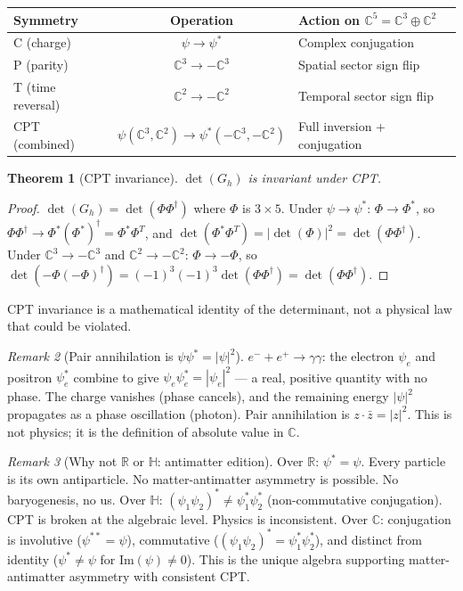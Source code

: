 \documentclass[12pt]{article}
\newtheorem{theorem}{Theorem}[section]
\theoremstyle{remark}
\newtheorem{remark}[theorem]{Remark}
\theoremstyle{definition}
\begin{document}
\begin{center}
\begin{tabular}{lcl}
\hline
Symmetry & Operation & Action on $\mathbb{C}^5 = \mathbb{C}^3 \oplus \mathbb{C}^2$ \\
\hline
C (charge) & $\psi \to \psi^*$ & Complex conjugation \\
P (parity) & $\mathbb{C}^3 \to -\mathbb{C}^3$ & Spatial sector sign flip \\
T (time reversal) & $\mathbb{C}^2 \to -\mathbb{C}^2$ & Temporal sector sign flip \\
\hline
CPT (combined) & $\psi(\mathbb{C}^3, \mathbb{C}^2) \to \psi^*(-\mathbb{C}^3, -\mathbb{C}^2)$ & Full inversion + conjugation \\
\hline
\end{tabular}
\end{center}

\begin{theorem}[CPT invariance]
$\det(G_h)$ is invariant under CPT.
\end{theorem}

\begin{proof}
$\det(G_h) = \det(\Phi\Phi^\dagger)$ where $\Phi$ is $3 \times 5$. Under $\psi \to \psi^*$: $\Phi \to \Phi^*$, so $\Phi\Phi^\dagger \to \Phi^*(\Phi^*)^\dagger = \Phi^*\Phi^T$, and $\det(\Phi^*\Phi^T) = |\det(\Phi)|^2 = \det(\Phi\Phi^\dagger)$. Under $\mathbb{C}^3 \to -\mathbb{C}^3$ and $\mathbb{C}^2 \to -\mathbb{C}^2$: $\Phi \to -\Phi$, so $\det(-\Phi(-\Phi)^\dagger) = (-1)^3(-1)^3\det(\Phi\Phi^\dagger) = \det(\Phi\Phi^\dagger)$.
\end{proof}

CPT invariance is a mathematical identity of the determinant, not a physical law that could be violated.

\begin{remark}[Pair annihilation is $\psi\psi^* = |\psi|^2$]
$e^- + e^+ \to \gamma\gamma$: the electron $\psi_e$ and positron $\psi^*_e$ combine to give $\psi_e \psi^*_e = |\psi_e|^2$ --- a real, positive quantity with no phase. The charge vanishes (phase cancels), and the remaining energy $|\psi|^2$ propagates as a phase oscillation (photon). Pair annihilation is $z \cdot \bar{z} = |z|^2$. This is not physics; it is the definition of absolute value in $\mathbb{C}$.
\end{remark}

\begin{remark}[Why not $\mathbb{R}$ or $\mathbb{H}$: antimatter edition]
Over $\mathbb{R}$: $\psi^* = \psi$. Every particle is its own antiparticle. No matter-antimatter asymmetry is possible. No baryogenesis, no us.
Over $\mathbb{H}$: $(\psi_1 \psi_2)^* \neq \psi^*_1 \psi^*_2$ (non-commutative conjugation). CPT is broken at the algebraic level. Physics is inconsistent.
Over $\mathbb{C}$: conjugation is involutive ($\psi^{**} = \psi$), commutative ($(\psi_1\psi_2)^* = \psi^*_1\psi^*_2$), and distinct from identity ($\psi^* \neq \psi$ for $\text{Im}(\psi) \neq 0$). This is the unique algebra supporting matter-antimatter asymmetry with consistent CPT.
\end{remark}
\end{document}
